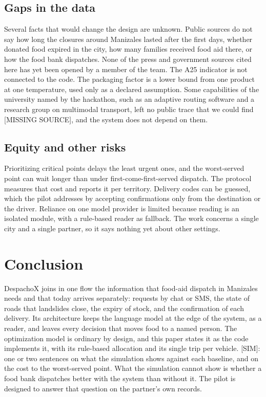 \documentclass[11pt]{article}
\newcommand{\pend}[1]{\textcolor{red!60!black}{#1}}
\begin{document}
\subsection{Gaps in the data}

Several facts that would change the design are unknown. Public sources do not say how long the closures around Manizales lasted after the first days, whether donated food expired in the city, how many families received food aid there, or how the food bank dispatches. None of the press and government sources cited here has yet been opened by a member of the team. The A25 indicator is not connected to the code. The packaging factor is a lower bound from one product at one temperature, used only as a declared assumption. Some capabilities of the university named by the hackathon, such as an adaptive routing software and a research group on multimodal transport, left no public trace that we could find \pend{[MISSING SOURCE]}, and the system does not depend on them.

\subsection{Equity and other risks}

Prioritizing critical points delays the least urgent ones, and the worst-served point can wait longer than under first-come-first-served dispatch. The protocol measures that cost and reports it per territory. Delivery codes can be guessed, which the pilot addresses by accepting confirmations only from the destination or the driver. Reliance on one model provider is limited because reading is an isolated module, with a rule-based reader as fallback. The work concerns a single city and a single partner, so it says nothing yet about other settings.

\section{Conclusion}\label{sec:conclusion}

DespachoX joins in one flow the information that food-aid dispatch in Manizales needs and that today arrives separately: requests by chat or SMS, the state of roads that landslides close, the expiry of stock, and the confirmation of each delivery. Its architecture keeps the language model at the edge of the system, as a reader, and leaves every decision that moves food to a named person. The optimization model is ordinary by design, and this paper states it as the code implements it, with its rule-based allocation and its single trip per vehicle. \pend{[SIM]: one or two sentences on what the simulation shows against each baseline, and on the cost to the worst-served point.} What the simulation cannot show is whether a food bank dispatches better with the system than without it. The pilot is designed to answer that question on the partner's own records.
\end{document}
